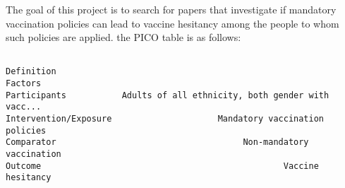 The goal of this project is to search for papers that investigate if mandatory vaccination policies can lead to vaccine hesitancy among the people to whom such policies are applied. the PICO table is as follows:




\begin{verbatim}                                                              Definition
Factors                                                                 
Participants           Adults of all ethnicity, both gender with vacc...
Intervention/Exposure                     Mandatory vaccination policies
Comparator                                     Non-mandatory vaccination
Outcome                                                Vaccine hesitancy\end{verbatim}



